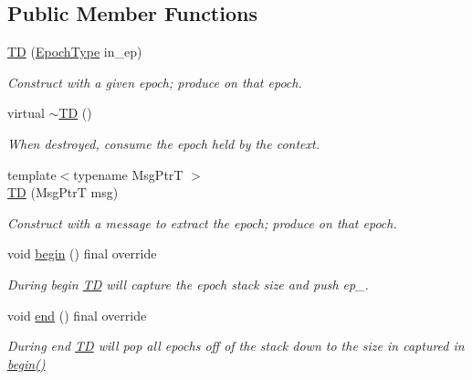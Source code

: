 \subsection*{Public Member Functions}
\begin{DoxyCompactItemize}
\item 
\hyperlink{structvt_1_1ctx_1_1_t_d_ade8d2b390d1b4a484dd9f5f20546bc91}{TD} (\hyperlink{namespacevt_a985a5adf291c34a3ca263b3378388236}{Epoch\+Type} in\+\_\+ep)
\begin{DoxyCompactList}\small\item\em Construct with a given epoch; produce on that epoch. \end{DoxyCompactList}\item 
virtual \hyperlink{structvt_1_1ctx_1_1_t_d_a7682445c6790c8176124c080c3ca340c}{$\sim$\+TD} ()
\begin{DoxyCompactList}\small\item\em When destroyed, consume the epoch held by the context. \end{DoxyCompactList}\item 
{\footnotesize template$<$typename Msg\+PtrT $>$ }\\\hyperlink{structvt_1_1ctx_1_1_t_d_a59c6dbce4737da7d99a9175be2ed9053}{TD} (Msg\+PtrT msg)
\begin{DoxyCompactList}\small\item\em Construct with a message to extract the epoch; produce on that epoch. \end{DoxyCompactList}\item 
void \hyperlink{structvt_1_1ctx_1_1_t_d_a5ba29186cd3ac75a48272e0ac050228b}{begin} () final override
\begin{DoxyCompactList}\small\item\em During begin {\ttfamily \hyperlink{structvt_1_1ctx_1_1_t_d}{TD}} will capture the epoch stack size and push {\ttfamily ep\+\_\+}. \end{DoxyCompactList}\item 
void \hyperlink{structvt_1_1ctx_1_1_t_d_a5131b9af6b389c90c1ac908c7dcc59b9}{end} () final override
\begin{DoxyCompactList}\small\item\em During end {\ttfamily \hyperlink{structvt_1_1ctx_1_1_t_d}{TD}} will pop all epochs off of the stack down to the size in captured in {\ttfamily \hyperlink{structvt_1_1ctx_1_1_t_d_a5ba29186cd3ac75a48272e0ac050228b}{begin()}} \end{DoxyCompactList}\item 

\end{DoxyCompactItemize}
